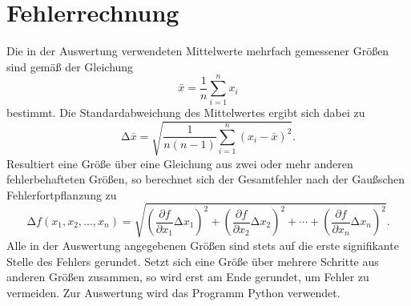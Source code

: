 \documentclass[
  bibliography=totoc,     %
  captions=tableheading,  %
  titlepage=firstiscover, %
]{scrartcl}
\begin{document}
\section{Fehlerrechnung}
\label{sec:fehlerrechnung}
Die in der Auswertung verwendeten Mittelwerte mehrfach gemessener Größen sind
gemäß der Gleichung
\begin{equation}
    \bar{x}=\frac{1}{n}\sum_{i=1}^n x_i
    \label{eqn:mittelwert}
\end{equation}
bestimmt. Die Standardabweichung des Mittelwertes ergibt sich dabei zu
\begin{equation}
    \mathup{\Delta}\bar{x}=\sqrt{\frac{1}{n(n-1)}\sum_{i=1}^n\left(x_i-\bar{x}\right)^2}.
    \label{eqn:standardabweichung}
\end{equation}
Resultiert eine Größe über eine Gleichung aus zwei oder mehr anderen
fehlerbehafteten Größen, so berechnet sich der Gesamtfehler nach der
Gaußschen Fehlerfortpflanzung zu
\begin{equation}
    \mathup{\Delta}f(x_1,x_2,...,x_n)=\sqrt{\left(\frac{\partial f}{\partial x_1}\mathup{\Delta}x_1\right)^2+\left(\frac{\partial f}{\partial x_2}\mathup{\Delta}x_2\right)^2+ \dotsb +\left(\frac{\partial f}{\partial x_n}\mathup{\Delta}x_n\right)^2}.
    \label{eqn:fehlerfortpflanzung}
\end{equation}
Alle in der Auswertung angegebenen Größen sind stets auf die erste signifikante
Stelle des Fehlers gerundet. Setzt sich eine Größe über mehrere Schritte aus
anderen Größen zusammen, so wird erst am Ende gerundet, um Fehler zu vermeiden.
Zur Auswertung wird das Programm Python verwendet.
\clearpage
\end{document}
